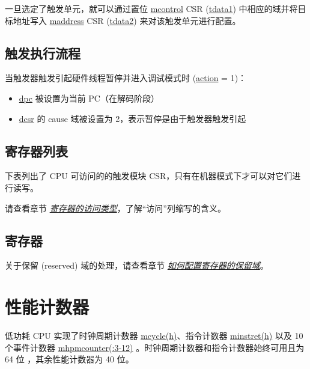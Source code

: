 \documentclass[main\_\_CN.tex]{subfiles}
\begin{document}
一旦选定了触发单元，就可以通过置位  \hyperref[regdesc:LPMCONTROL]{mcontrol} CSR (\hyperref[regdesc:LPTDATA1]{tdata1}) 中相应的域并将目标地址写入 \hyperref[regdesc:LPMADDRESS]{maddress} CSR (\hyperref[regdesc:LPTDATA2]{tdata2}) 来对该触发单元进行配置。


\subsection{触发执行流程}
\label{sec:ulp-hwt-suggest-op}

当触发器触发引起硬件线程暂停并进入调试模式时 (\hyperref[fielddesc:LPMCONTROLACTION]{action} = 1)：
\begin{itemize}
    \item \hyperref[regdesc:LPDPC]{dpc} 被设置为当前 PC（在解码阶段）
    \item \hyperref[regdesc:LPDCSR]{dcsr} 的 cause 域被设置为 2，表示暂停是由于触发器触发引起
\end{itemize}


\subsection{寄存器列表}
\label{sec:ulp-hwt-reg-summ}
下表列出了 CPU 可访问的的触发模块 CSR，只有在机器模式下才可以对它们进行读写。

请查看章节 \hyperref[glossary-access-types]{\textit{寄存器的访问类型}}，了解“访问”列缩写的含义。



\subsection{寄存器}
\label{sec:ulp-hwt-reg}

关于保留 (reserved) 域的处理，请查看章节 \hyperref[programming-reserved-field]{\textit{如何配置寄存器的保留域}}。



\section{性能计数器}

低功耗 CPU 实现了时钟周期计数器 \hyperref[regdesc:LPMCYCLEH]{mcycle(h)}、指令计数器 \hyperref[regdesc:LPMINSTRETH]{minstret(h)} 以及 10 个事件计数器 \hyperref[regdesc:LPMHPMCOUNTER]{mhpmcounter(:3-12)} 。时钟周期计数器和指令计数器始终可用且为 64 位 ，其余性能计数器为 40 位。
\end{document}
